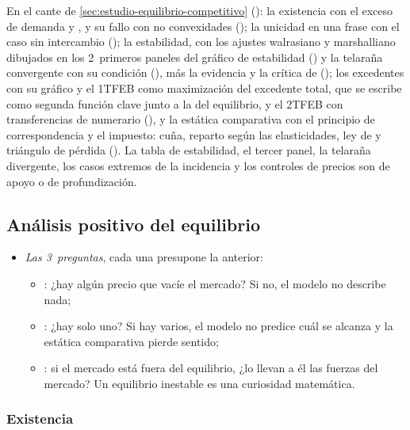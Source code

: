 \documentclass[11pt]{article}
\begin{document}
\begin{notaopositor}
En el cante de \ref{sec:estudio-equilibrio-competitivo} (): la existencia con el exceso de demanda y , y su fallo con no convexidades (); la unicidad en una frase con el caso sin intercambio (); la estabilidad, con los ajustes walrasiano y marshalliano dibujados en los 2~primeros paneles del gráfico de estabilidad () y la telaraña convergente con su condición (), más la evidencia y la crítica de  (); los excedentes con su gráfico y el 1TFEB como maximización del excedente total, que se escribe como segunda función clave junto a la del equilibrio, y el 2TFEB con transferencias de numerario (), y la estática comparativa con el principio de correspondencia y el impuesto: cuña, reparto según las elasticidades, ley de  y triángulo de pérdida (). La tabla de estabilidad, el tercer panel, la telaraña divergente, los casos extremos de la incidencia y los controles de precios son de apoyo o de profundización.
\end{notaopositor}

\subsection{Análisis positivo del equilibrio}\label{sec:analisis-positivo-equilibrio}

\begin{itemize}
\item \emph{Las 3~preguntas}, cada una presupone la anterior:
  \begin{itemize}
  \item {}: ¿hay algún precio que vacíe el mercado? Si no, el modelo no describe nada;
  \item {}: ¿hay solo uno? Si hay varios, el modelo no predice cuál se alcanza y la estática comparativa pierde sentido;
  \item {}: si el mercado está fuera del equilibrio, ¿lo llevan a él las fuerzas del mercado? Un equilibrio inestable es una curiosidad matemática.
  \end{itemize}
\end{itemize}

\subsubsection{Existencia}\label{sec:existencia}
\end{document}
